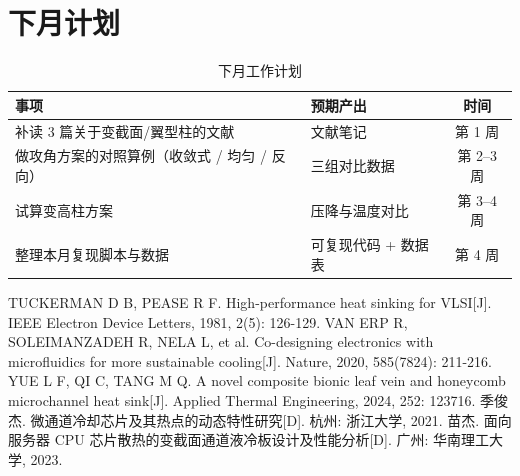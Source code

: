 \documentclass[stage1]{ydzjreport}
\begin{document}
\section{下月计划}

\begin{table}[htbp]
\centering
\caption{下月工作计划}
\begin{tabularx}{\textwidth}{@{}Y Y c@{}}
\toprule
{} 事项 & 预期产出 & 时间 \\
\midrule
补读 3 篇关于变截面/翼型柱的文献 & 文献笔记 & 第 1 周 \\
做攻角方案的对照算例（收敛式 / 均匀 / 反向） & 三组对比数据 & 第 2--3 周 \\
试算变高柱方案 & 压降与温度对比 & 第 3--4 周 \\
整理本月复现脚本与数据 & 可复现代码 + 数据表 & 第 4 周 \\
\bottomrule
\end{tabularx}
\end{table}

\begin{thebibliography}{9}
 TUCKERMAN D B, PEASE R F. High-performance heat sinking for VLSI[J]. IEEE Electron Device Letters, 1981, 2(5): 126-129.
 VAN ERP R, SOLEIMANZADEH R, NELA L, et al. Co-designing electronics with microfluidics for more sustainable cooling[J]. Nature, 2020, 585(7824): 211-216.
 YUE L F, QI C, TANG M Q. A novel composite bionic leaf vein and honeycomb microchannel heat sink[J]. Applied Thermal Engineering, 2024, 252: 123716.
 季俊杰. 微通道冷却芯片及其热点的动态特性研究[D]. 杭州: 浙江大学, 2021.
 苗杰. 面向服务器 CPU 芯片散热的变截面通道液冷板设计及性能分析[D]. 广州: 华南理工大学, 2023.
\end{thebibliography}
\end{document}
